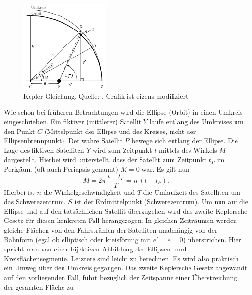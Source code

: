 \begin{figure}[h]                                                                           %
	\centering                                                                            	%
	\includegraphics[width=0.4\textwidth]{./images/keplers_equation.jpg}                    %
	\caption[Kepler-Gleichung]{Kepler-Gleichung, Quelle: \cite{Wiki:KeplerGl}, 
								Grafik ist eigens modifiziert}              				%
	\label{fig:kepler_gl}                                                                	%
\end{figure}                                                                              	%
Wie schon bei früheren Betrachtungen wird die Ellipse (Orbit) in einen Umkreis eingeschrieben. Ein fiktiver (mittlerer) Satellit \ensuremath{Y} laufe entlang des Umkreises um den Punkt \ensuremath{C} (Mittelpunkt der Ellipse und des Kreises, nicht der Ellipsenbrennpunkt). Der wahre Satellit \ensuremath{P} bewege sich entlang der Ellipse. Die Lage des fiktiven Satelliten \ensuremath{Y} wird zum Zeitpunkt \ensuremath{t} mittels des Winkels \ensuremath{M} dargestellt. Hierbei wird unterstellt, dass der Satellit zum Zeitpunkt \ensuremath{t_P} im Perigäum (oft auch Periapsis genannt) \ensuremath{M=0} war. Es gilt nun
\begin{equation}
	M=2\pi\,\frac{t-t_P}{T}=n\,(t-t_P).
\end{equation}   
Hierbei ist \ensuremath{n} die Winkelgeschwindigkeit und \ensuremath{T} die Umlaufzeit des Satelliten um das Schwerezentrum. \ensuremath{S} ist der Erdmittelpunkt (Schwerezentrum). 
Um nun auf die Ellipse und auf den tatsächlichen Satellit überzugehen wird das zweite Keplersche Gesetz für diesen konkreten Fall herangezogen. In gleichen Zeiträumen werden gleiche Flächen von den Fahrstrählen der Satelliten unabhängig von der Bahnform (egal ob elliptisch oder kreisförmig mit \ensuremath{e'=e=0}) überstrichen. Hier spricht man von einer bijektiven Abbildung der Ellipsen- und Kreisflächensegmente. Letztere sind leicht zu berechnen. Es wird also praktisch ein Umweg über den Umkreis gegangen. Das zweite Keplersche Gesetz angewandt auf den vorliegenden Fall, führt bezüglich der Zeitspanne einer Überstreichung der gesamten Fläche zu
